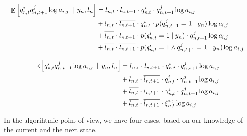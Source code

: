 \documentclass[a4paper, 11pt]{article}
\newcommand{\conde}[2]{\mathop{\mathbb{E}}\left[#1 \hspace{.2em}\mid\hspace{.2em} #2 \right]}
\begin{document}
\begin{displaymath}
  \begin{split}
    \conde{ q_{n, t}^i q_{n, t+1}^j \log{a_{i,j}}}{y_{n}, l_{n}}
    & = l_{n, t} \cdot l_{n, t+1} \cdot q_{n, t}^i \cdot q_{n, t+1}^j \log{a_{i, j}}\\
    & + l_{n, t} \cdot \overline{l_{n, t+1}} \cdot q_{n, t}^i \cdot p(q_{n, t+1}^j = 1 \mid y_{n}) \log{a_{i, j}} \\
    & + \overline{l_{n, t}} \cdot l_{n, t+1} \cdot p(q_{n, t}^i = 1 \mid y_{n}) \cdot q_{n, t + 1}^j \log{a_{i, j}} \\
    & + \overline{l_{n, t}} \cdot \overline{l_{n, t+1}} \cdot p(q_{n, t}^i = 1 \wedge q_{n, t + 1}^j = 1  \mid y_{n}) \log{a_{i, j}} \\
  \end{split}
\end{displaymath}

\begin{displaymath}
  \begin{split}
    \conde{ q_{n, t}^i q_{n, t+1}^j \log{a_{i,j}}}{y_{n}, l_{n}}
    & = l_{n, t} \cdot l_{n, t+1} \cdot q_{n, t}^i \cdot q_{n, t+1}^j \log{a_{i, j}}\\
    & + l_{n, t} \cdot \overline{l_{n, t+1}} \cdot q_{n, t}^i \cdot \gamma_{n, t+1}^j \log{a_{i, j}} \\
    & + \overline{l_{n, t}} \cdot l_{n, t+1} \cdot \gamma_{n, t}^i \cdot q_{n, t + 1}^j \log{a_{i, j}} \\
    & + \overline{l_{n, t}} \cdot \overline{l_{n, t+1}} \cdot \xi_{n, t}^{i,j} \log{a_{i, j}} \\
  \end{split}
\end{displaymath}

In the algorihtmic point of view, we have four cases, based on our
knowledge of the current and the next state.





\end{document}
